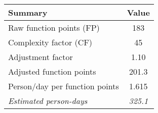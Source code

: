 \begin{tabular}{l|c}
\textbf{Summary} & \textbf{Value} \\ \hline
Raw function points (FP) & 183 \\
Complexity factor (CF) & 45 \\
Adjustment factor & 1.10 \\
Adjusted function points & 201.3 \\
Person/day per function points & 1.615 \\ \hline
\textit{Estimated person-days} & \textit{325.1}
\end{tabular}
